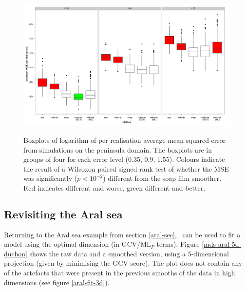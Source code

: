 \begin{figure}
\centering
\includegraphics[width=\textwidth]{mds/figs/wt2-boxplot-duchon.pdf} \\
\caption{Boxplots of logarithm of per realisation average mean squared error from simulations on the peninsula domain. The boxplots are in groups of four for each error level (0.35, 0.9, 1.55). Colours indicate the result of a Wilcoxon paired signed rank test of whether the MSE was significantly ($p<10^{-2}$) different from the soap film smoother. Red indicates different and worse, green different and better.}
\label{wt2-boxplot-duchon}
\end{figure}


\subsection{Revisiting the Aral sea}
\label{aral-revisit}
Returning to the Aral sea example from section \ref{aral-sec}, \mdsds\ can be used to fit a model using the optimal dimension (in GCV/$\text{ML}_P$ terms). Figure \ref{mds-aral-5d-duchon} shows the raw data and a smoothed version, using a 5-dimensional projection (given by minimising the GCV score). The plot does not contain any of the artefacts that were present in the previous smooths of the data in high dimensions (see figure \ref{aral-fit-3d}).

